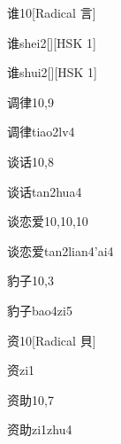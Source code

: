 \begin{entry}{谁}{10}[Radical 言]
  \begin{phonetics}{谁}{shei2}[][HSK 1]
  \end{phonetics}
  \begin{phonetics}{谁}{shui2}[][HSK 1]
  \end{phonetics}
\end{entry}

\begin{entry}{调律}{10,9}
  \begin{phonetics}{调律}{tiao2lv4}
  \end{phonetics}
\end{entry}

\begin{entry}{谈话}{10,8}
  \begin{phonetics}{谈话}{tan2hua4}
  \end{phonetics}
\end{entry}

\begin{entry}{谈恋爱}{10,10,10}
  \begin{phonetics}{谈恋爱}{tan2lian4'ai4}
  \end{phonetics}
\end{entry}

\begin{entry}{豹子}{10,3}
  \begin{phonetics}{豹子}{bao4zi5}
  \end{phonetics}
\end{entry}

\begin{entry}{资}{10}[Radical 貝]
  \begin{phonetics}{资}{zi1}
  \end{phonetics}
\end{entry}

\begin{entry}{资助}{10,7}
  \begin{phonetics}{资助}{zi1zhu4}
  \end{phonetics}
\end{entry}

